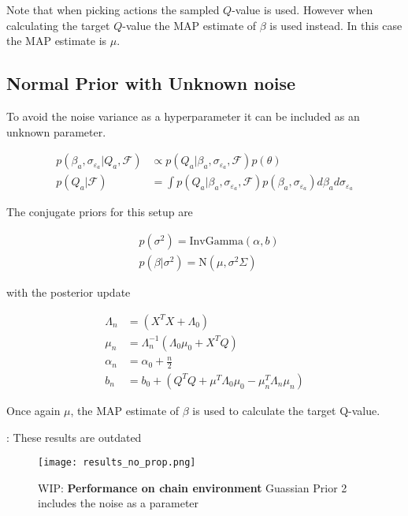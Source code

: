 Note that when picking actions the sampled $Q$-value is used. However when calculating the target $Q$-value the MAP estimate of $\beta$ is used instead. In this case the MAP estimate is $\mu$. 

\subsection{Normal Prior with Unknown noise}

To avoid the noise variance as a hyperparameter it can be included as an unknown parameter.

\begin{align*}
    p(\beta_a, \sigma_{\varepsilon_a}|Q_a, \mathcal{F}) &\propto p(Q_a| \beta_a, \sigma_{\varepsilon_a}, \mathcal{F})p(\theta) \\
    p(Q_a|\mathcal{F}) &= \int p(Q_a|\beta_a, \sigma_{\varepsilon_a}, \mathcal{F}) p(\beta_a, \sigma_{\varepsilon_a})d\beta_a d\sigma_{\varepsilon_a}
\end{align*}

The conjugate priors for this setup are

\begin{align*}
    & p(\sigma^2) = \text{InvGamma}(\alpha, b)          \\
    & p(\beta|\sigma^2) = \text{N}(\mu, \sigma^2\Sigma) 
\end{align*}

with the posterior update

\begin{align*}
	\Lambda_n & = (X^TX + \Lambda_0)                                         \\
	\mu_n     & = \Lambda_n^{-1}(\Lambda_0\mu_0 + X^TQ)                      \\
	\alpha_n  & = \alpha_0 + \frac{n}{2}                                     \\
	b_n       & = b_0 + (Q^TQ + \mu^T\Lambda_0\mu_0 - \mu_n^T\Lambda_n\mu_n) 
\end{align*}

Once again $\mu$, the MAP estimate of $\beta$ is used to calculate the target Q-value.

\todo: These results are outdated

\begin{figure}[H]
    \centering
    \texttt{[image: results\_no\_prop.png]}
    \caption{WIP: \textbf{Performance on chain environment} Guassian Prior 2 includes the noise as a parameter}
    \label{fig:results_no_propr}
\end{figure}


